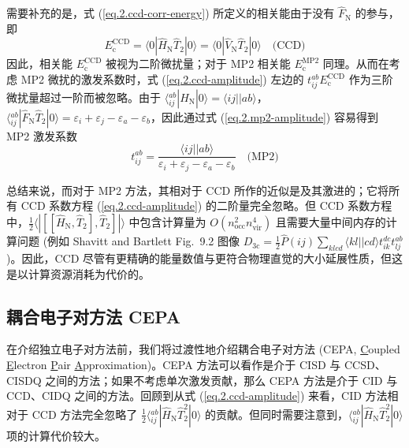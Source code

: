 \begin{itemize}[nosep]
  需要补充的是，式 (\ref{eq.2.ccd-corr-energy}) 所定义的相关能由于没有 $\hat F_\mathrm{N}$ 的参与，即
  \begin{equation*}
    E_\mathrm{c}^\mathrm{CCD} = \langle 0 | \hat H_\mathrm{N} \hat T_2 | 0 \rangle = \langle 0 | \hat V_\mathrm{N} \hat T_2 | 0 \rangle \quad \text{(CCD)}
  \end{equation*}
  因此，相关能 $E_\mathrm{c}^\mathrm{CCD}$ 被视为二阶微扰量；对于 MP2 相关能 $E_\mathrm{c}^\mathrm{MP2}$ 同理。从而在考虑 MP2 微扰的激发系数时，式 (\ref{eq.2.ccd-amplitude}) 左边的 $t_{ij}^{ab} E_\mathrm{c}^\mathrm{CCD}$ 作为三阶微扰量超过一阶而被忽略。由于 $\langle {}_{ij}^{ab} | \hat H_\mathrm{N} | 0 \rangle = \langle ij || ab \rangle$，$\langle {}_{ij}^{ab} | \hat F_\mathrm{N} \hat T_2 | 0 \rangle = \varepsilon_i + \varepsilon_j - \varepsilon_a - \varepsilon_b$，因此通过式 (\ref{eq.2.mp2-amplitude}) 容易得到 MP2 激发系数
  \begin{equation}
    t_{ij}^{ab} = \frac{\langle ij || ab \rangle}{\varepsilon_i + \varepsilon_j - \varepsilon_a - \varepsilon_b} \quad \text{(MP2)}
  \end{equation}
\end{itemize}

总结来说，而对于 MP2 方法，其相对于 CCD 所作的近似是及其激进的；它将所有 CCD 系数方程 (\ref{eq.2.ccd-amplitude}) 的二阶量完全忽略。但 CCD 系数方程中，$\frac{1}{2} \langle | [[\hat H_\mathrm{N}, \hat T_2], \hat T_2] | \rangle$ 中包含计算量为 $O(n_\mathrm{occ}^2 n_\mathrm{vir}^4)$ 且需要大量中间内存的计算问题 (例如 Shavitt and Bartlett\cite{Shavitt-Bartlett.Cambridge.2009} Fig.\ 9.2 图像 $D_\mathrm{3c} = \frac{1}{2} \hat P(ij) \sum_{klcd} \langle kl || cd \rangle t_{ik}^{dc} t_{lj}^{ab}$)。因此，CCD 尽管有更精确的能量数值与更符合物理直觉的大小延展性质，但这是以计算资源消耗为代价的。
  
\subsection{耦合电子对方法 CEPA}

在介绍独立电子对方法前，我们将过渡性地介绍耦合电子对方法 (CEPA, \underline{C}oupled \underline{E}lectron \underline{P}air \underline{A}pproximation)\cite{Ahlrichs-Ahlrichs.CPC.1979}。CEPA 方法可以看作是介于 CISD 与 CCSD、CISDQ 之间的方法；如果不考虑单次激发贡献，那么 CEPA 方法是介于 CID 与 CCD、CIDQ 之间的方法。回顾到从式 (\ref{eq.2.ccd-amplitude}) 来看，CID 方法相对于 CCD 方法完全忽略了 $\frac{1}{2} \langle {}_{ij}^{ab} | \hat H_\mathrm{N} \hat T_2^2 | 0 \rangle$ 的贡献。但同时需要注意到，$\langle {}_{ij}^{ab} | \hat H_\mathrm{N} \hat T_2^2 | 0 \rangle$ 项的计算代价较大。


